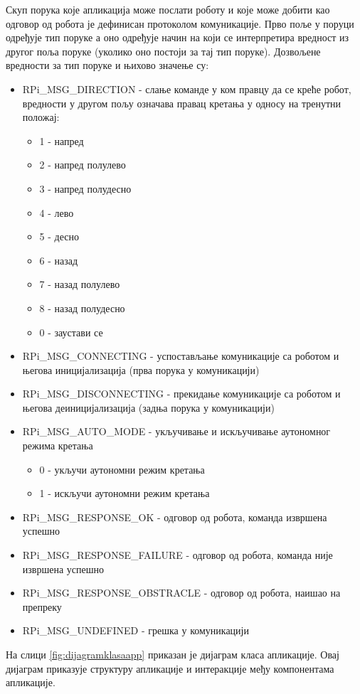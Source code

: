 \documentclass[12pt,oneside]{memoir}
\theoremstyle{remark}
\begin{document}
Скуп порука које апликација може послати роботу и које може добити као одговор од робота је дефинисан протоколом комуникације. Прво поље у поруци одређује тип поруке а оно одређује начин на који се интерпретира вредност из другог поља поруке (уколико оно постоји за тај тип поруке). Дозвољене вредности за тип поруке и њихово значење су:
\begin{itemize}
\item RPi\_MSG\_DIRECTION - слање команде у ком правцу да се креће робот, вредности у другом пољу означава правац кретања у односу на тренутни положај:
	\begin{itemize}
	\item 1 - напред
	\item 2 - напред полулево
	\item 3 - напред полудесно
	\item 4 - лево
	\item 5 - десно
	\item 6 - назад
	\item 7 - назад полулево
	\item 8 - назад полудесно
	\item 0 - заустави се
	\end{itemize}
\item RPi\_MSG\_CONNECTING - успостављање комуникације са роботом и његова иницијализација (прва порука у комуникацији)
\item RPi\_MSG\_DISCONNECTING - прекидање комуникације са роботом и његова деиницијализација (задња порука у комуникацији)
\item RPi\_MSG\_AUTO\_MODE - укључивање и искључивање аутономног режима кретања
	\begin{itemize}
	\item 0 - укључи аутономни режим кретања
	\item 1 - искључи аутономни режим кретања
	\end{itemize}
\item RPi\_MSG\_RESPONSE\_OK - одговор од робота, команда извршена успешно
\item RPi\_MSG\_RESPONSE\_FAILURE - одговор од робота, команда није извршена успешно
\item RPi\_MSG\_RESPONSE\_OBSTRACLE - одговор од робота, наишао на препреку
\item RPi\_MSG\_UNDEFINED - грешка у комуникацији
\end{itemize}

На слици \ref{fig:dijagramklasaapp} приказан је дијаграм класа апликације. Овај дијаграм приказује структуру апликације и интеракције међу компонентама апликације.
\end{document}
